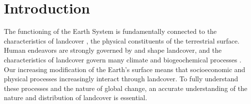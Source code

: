 \documentclass[a4paper]{article}
\begin{document}
\begin{abstract}
{%
}
\end{abstract}


\linenumbers

\section*{Introduction}
The functioning of the Earth System is fundamentally connected to the characteristics of landcover \citep{lambin_modelling_1997}, the physical constituents of the terrestrial surface. Human endeavors are strongly governed by and shape landcover, and the characteristics of landcover govern many climate and biogeochemical processes \citep{lambin_dynamics_2003}. Our increasing modification of the Earth's surface \citep{lambin_dynamics_2003} means that socioeconomic and physical processes increasingly interact through landcover. To fully understand these processes and the nature of global change, an accurate understanding of the nature and distribution of landcover is essential.  
\end{document}
